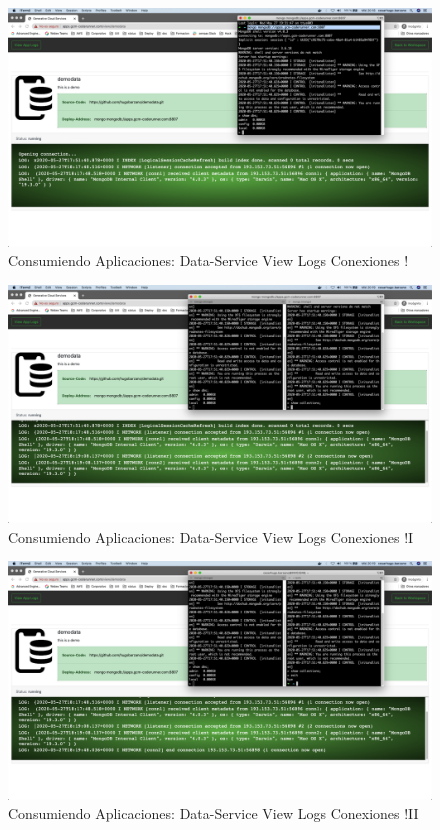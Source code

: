 \documentclass[a4paper,11pt]{book}
\begin{document}
\begin{figure}[H]
\centering
\includegraphics[scale=0.2]{imagenes/casouso/1_14.png}
\caption{  Consumiendo Aplicaciones: Data-Service View Logs Conexiones !  }
\end{figure}

\begin{figure}[H]
\centering
\includegraphics[scale=0.2]{imagenes/casouso/1_15.png}
\caption{  Consumiendo Aplicaciones: Data-Service View Logs Conexiones !I  }
\end{figure}

\begin{figure}[H]
\centering
\includegraphics[scale=0.2]{imagenes/casouso/1_16.png}
\caption{ Consumiendo Aplicaciones: Data-Service View Logs Conexiones !II   }
\end{figure}
\end{document}
